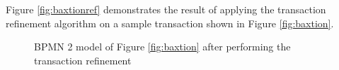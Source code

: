 %

Figure \ref{fig:baxtionref} demonstrates the result of applying the transaction refinement algorithm on a sample transaction shown in Figure \ref{fig:baxtion}. 

\begin{figure}
{}

\caption[Figure \ref{fig:baxtion} after refinement]{BPMN 2 model of Figure \ref{fig:baxtion} after performing the transaction refinement}
\label{fig:refinedbahbah}
\end{figure}

